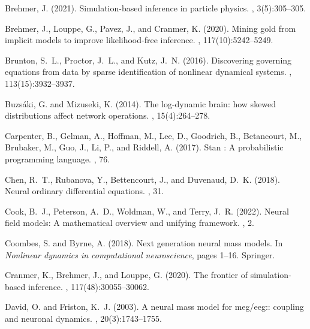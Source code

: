 \documentclass[12pt]{article}
\begin{document}
\begin{thebibliography}{}
Brehmer, J. (2021).
\newblock Simulation-based inference in particle physics.
, 3(5):305--305.

Brehmer, J., Louppe, G., Pavez, J., and Cranmer, K. (2020).
\newblock Mining gold from implicit models to improve likelihood-free
  inference.
,
  117(10):5242--5249.

Brunton, S.~L., Proctor, J.~L., and Kutz, J.~N. (2016).
\newblock Discovering governing equations from data by sparse identification of
  nonlinear dynamical systems.
,
  113(15):3932--3937.

Buzs{\'a}ki, G. and Mizuseki, K. (2014).
\newblock The log-dynamic brain: how skewed distributions affect network
  operations.
, 15(4):264--278.

Carpenter, B., Gelman, A., Hoffman, M., Lee, D., Goodrich, B., Betancourt, M.,
  Brubaker, M., Guo, J., Li, P., and Riddell, A. (2017).
\newblock Stan : A probabilistic programming language.
, 76.

Chen, R.~T., Rubanova, Y., Bettencourt, J., and Duvenaud, D.~K. (2018).
\newblock Neural ordinary differential equations.
, 31.

Cook, B.~J., Peterson, A.~D., Woldman, W., and Terry, J.~R. (2022).
\newblock Neural field models: A mathematical overview and unifying framework.
, 2.

Coombes, S. and Byrne, A. (2018).
\newblock Next generation neural mass models.
\newblock In {\em Nonlinear dynamics in computational neuroscience}, pages
  1--16. Springer.

Cranmer, K., Brehmer, J., and Louppe, G. (2020).
\newblock The frontier of simulation-based inference.
,
  117(48):30055--30062.

David, O. and Friston, K.~J. (2003).
\newblock A neural mass model for meg/eeg:: coupling and neuronal dynamics.
, 20(3):1743--1755.


\end{thebibliography}
\end{document}
